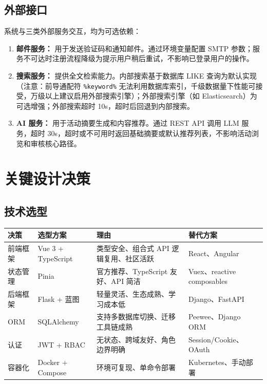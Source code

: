 \documentclass[12pt,a4paper]{ctexart}
\begin{document}
\subsection{外部接口}
系统与三类外部服务交互，均为可选依赖：
\begin{enumerate}
\item \textbf{邮件服务：} 用于发送验证码和通知邮件。通过环境变量配置 SMTP 参数；服务不可达时注册流程降级为提示用户稍后重试，不影响已登录用户的操作。
\item \textbf{搜索服务：} 提供全文检索能力。内部搜索基于数据库 LIKE 查询为默认实现（注意：前导通配符 \texttt{\%keyword\%} 无法利用数据库索引，千级数据量下性能可接受，万级以上建议启用外部搜索引擎）；外部搜索引擎（如 Elasticsearch）为可选增强；外部搜索超时 10s，超时后回退到内部搜索。
\item \textbf{AI 服务：} 用于活动摘要生成和内容推荐。通过 REST API 调用 LLM 服务，超时 30s，超时或不可用时返回基础摘要或默认推荐列表，不影响活动浏览和审核核心路径。
\end{enumerate}

\section{关键设计决策}
\subsection{技术选型}
\begin{longtable}{p{2.4cm}p{3.2cm}p{3.8cm}p{3.8cm}}
\toprule 决策 & 选型方案 & 理由 & 替代方案 \\\midrule\endhead
前端框架 & Vue 3 + TypeScript & 类型安全、组合式 API 逻辑复用、社区活跃 & React、Angular \\
状态管理 & Pinia & 官方推荐、TypeScript 友好、API 简洁 & Vuex、reactive composables \\
后端框架 & Flask + 蓝图 & 轻量灵活、生态成熟、学习成本低 & Django、FastAPI \\
ORM & SQLAlchemy & 支持多数据库切换、迁移工具链成熟 & Peewee、Django ORM \\
认证 & JWT + RBAC & 无状态、跨域友好、角色边界明确 & Session/Cookie、OAuth \\
容器化 & Docker + Compose & 环境可复现、单命令部署 & Kubernetes、手动部署 \\
\bottomrule
\end{longtable}
\end{document}
